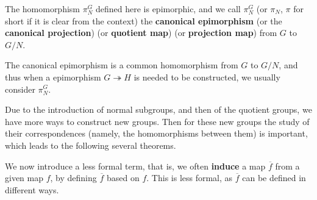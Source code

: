 \documentclass{article}
\begin{document}
\begin{Rmk}{}
    \begin{compactenum}
        \item \textcolor{Th}{The homomorphism $\pi_N^G$ defined here is epimorphic, } \textcolor{Df}{and we call $\pi_N^G$ (or $\pi_N$, $\pi$ for short if it is clear from the context) the \textbf{canonical epimorphism} (or the \textbf{canonical projection}) (or \textbf{quotient map}) (or \textbf{projection map}) from $G$ to $G/N$.}
        \item The canonical epimorphism is a common homomorphism from $G$ to $G/N$, and thus when a epimorphism $G\twoheadrightarrow H$ is needed to be constructed, we usually consider $\pi_N^G$.
        \item Due to the introduction of normal subgroups, and then of the quotient groups, we have more ways to construct new groups. Then for these new groups the study of their correspondences (namely, the homomorphisms between them) is important, which leads to the following several theorems.
        \item \textcolor{Df}{We now introduce a less formal term, that is, we often \textbf{induce} a map $\overline{f}$ from a given map $f$, by defining $\overline{f}$ based on $f$.} This is less formal, as $\overline{f}$ can be defined in different ways.
    \end{compactenum}
\end{Rmk}
\end{document}
